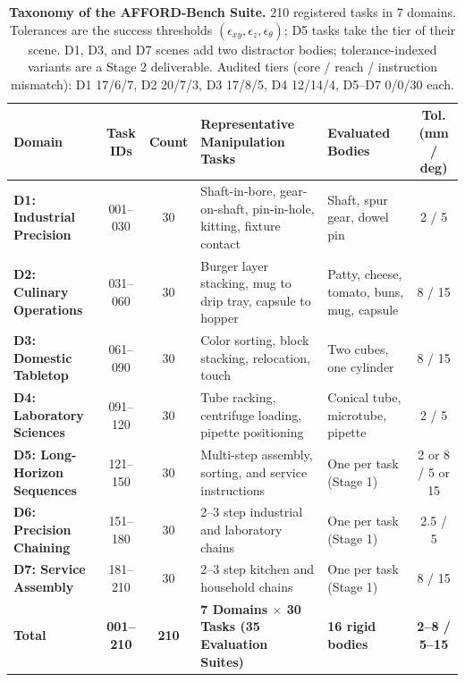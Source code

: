 \documentclass[conference]{IEEEtran}
\begin{document}
\begin{table}[t]
\centering
\caption{\textbf{Taxonomy of the AFFORD-Bench Suite.} 210 registered tasks in 7 domains. Tolerances are the success thresholds $(\epsilon_{xy}, \epsilon_z, \epsilon_\theta)$; D5 tasks take the tier of their scene. D1, D3, and D7 scenes add two distractor bodies; tolerance-indexed variants are a Stage 2 deliverable. Audited tiers (core / reach / instruction mismatch): D1 17/6/7, D2 20/7/3, D3 17/8/5, D4 12/14/4, D5--D7 0/0/30 each.}
\label{tab:domains}
\scriptsize
\setlength{\tabcolsep}{2.5pt}
\renewcommand{\arraystretch}{0.91}
\begin{tabularx}{\linewidth}{lccXXc}
\toprule
\textbf{Domain} & \textbf{Task IDs} & \textbf{Count} & \textbf{Representative Manipulation Tasks} & \textbf{Evaluated Bodies} & \textbf{Tol. (mm / deg)} \\
\midrule
\textbf{D1: Industrial Precision} & 001--030 & 30 & Shaft-in-bore, gear-on-shaft, pin-in-hole, kitting, fixture contact & Shaft, spur gear, dowel pin & 2 / 5 \\
\textbf{D2: Culinary Operations} & 031--060 & 30 & Burger layer stacking, mug to drip tray, capsule to hopper & Patty, cheese, tomato, buns, mug, capsule & 8 / 15 \\
\textbf{D3: Domestic Tabletop} & 061--090 & 30 & Color sorting, block stacking, relocation, touch & Two cubes, one cylinder & 8 / 15 \\
\textbf{D4: Laboratory Sciences} & 091--120 & 30 & Tube racking, centrifuge loading, pipette positioning & Conical tube, microtube, pipette & 2 / 5 \\
\textbf{D5: Long-Horizon Sequences} & 121--150 & 30 & Multi-step assembly, sorting, and service instructions & One per task (Stage 1) & 2 or 8 / 5 or 15 \\
\textbf{D6: Precision Chaining} & 151--180 & 30 & 2--3 step industrial and laboratory chains & One per task (Stage 1) & 2.5 / 5 \\
\textbf{D7: Service Assembly} & 181--210 & 30 & 2--3 step kitchen and household chains & One per task (Stage 1) & 8 / 15 \\
\midrule
\textbf{Total} & \textbf{001--210} & \textbf{210} & \textbf{7 Domains $\times$ 30 Tasks (35 Evaluation Suites)} & \textbf{16 rigid bodies} & \textbf{2--8 / 5--15} \\
\bottomrule
\end{tabularx}
\end{table}
\end{document}
